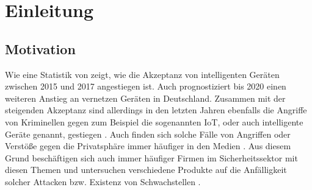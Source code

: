 \chapter{Einleitung}

\section{Motivation}
Wie eine Statistik von \cite{nier_2017} zeigt, wie die Akzeptanz von intelligenten Geräten zwischen 2015 und 2017 angestiegen ist. Auch %
prognostiziert bis 2020 einen weiteren Anstieg an vernetzen Geräten in Deutschland.
Zusammen mit der steigenden Akzeptanz sind allerdings in den letzten Jahren ebenfalls die Angriffe von Kriminellen gegen zum Beispiel die sogenannten \ac{IoT}, oder auch intelligente Geräte genannt, gestiegen
.
Auch finden sich solche Fälle von Angriffen oder Verstöße gegen die Privatsphäre immer häufiger in den Medien %
. Aus diesem Grund beschäftigen sich auch immer häufiger Firmen im Sicherheitssektor mit diesen Themen und untersuchen verschiedene Produkte auf die Anfälligkeit solcher Attacken bzw. Existenz von Schwachstellen %
.

